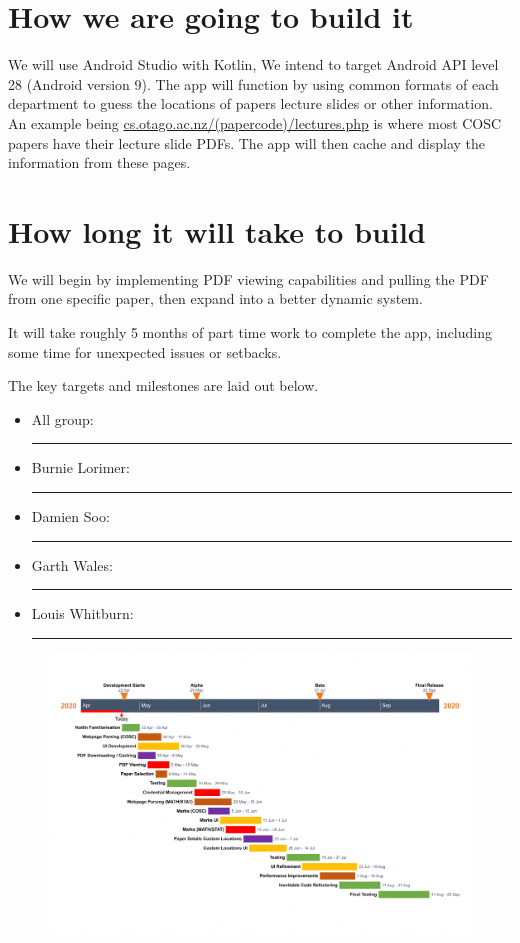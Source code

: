 \documentclass{article}
\begin{document}
	\section{How we are going to build it}

	We will use Android Studio with Kotlin, We intend to target Android API level 28 (Android version 9). The app will function by using common formats of each department to guess the locations of papers lecture slides or other information. An example being \url{cs.otago.ac.nz/(papercode)/lectures.php} is where most COSC papers have their lecture slide PDFs. The app will then cache and display the information from these pages.

	\section{How long it will take to build}

	We will begin by implementing PDF viewing capabilities and pulling the PDF from one specific paper, then expand into a better dynamic system. 

	It will take roughly 5 months of part time work to complete the app, including some time for unexpected issues or setbacks.
	
	The key targets and milestones are laid out below.
	
	\begin{itemize}
		\item All group: {\color{ag} \rule{\baselineskip}{\baselineskip}}
		\item Burnie Lorimer: {\color{bl} \rule{\baselineskip}{\baselineskip}}
		\item Damien Soo: {\color{ds} \rule{\baselineskip}{\baselineskip}}
		\item Garth Wales: {\color{gw} \rule{\baselineskip}{\baselineskip}}
		\item Louis Whitburn: {\color{lw} \rule{\baselineskip}{\baselineskip}}
	\end{itemize}
	
	\begin{figure}[H]
		\centering
		\includegraphics[width=\linewidth]{chart.png}
	\end{figure}
	
\end{document}
